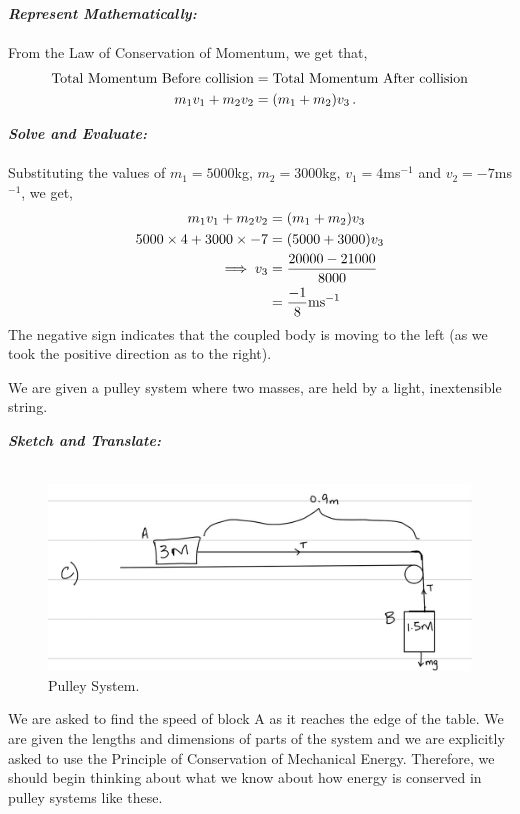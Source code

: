 \begin{subquestions}
\textbf{\textit{Represent Mathematically:}} \\ \\
From the Law of Conservation of Momentum, we get that,
\begin{align}
	\text{Total Momentum Before collision} & = \text{Total Momentum After collision} \nonumber \\
	m_1v_1 + m_2v_2 & = (m_1+m_2)v_3 \,.
\end{align}
	
	
	
	
\textbf{\textit{Solve and Evaluate:}} \\ \\
Substituting the values of $m_1=5000$kg, $m_2=3000$kg, $v_1=4$ms$^{-1}$ and $v_2=-7$ms$^{-1}$, we get,
\begin{align}
	m_1v_1 + m_2v_2 & = (m_1+m_2)v_3 \nonumber \\
	5000\times4 + 3000\times-7 & = (5000+3000)v_3 \nonumber \\
	\implies v_3 & = \frac{20000-21000}{8000} \nonumber \\
	             & = \frac{-1}{8}\text{ms}^{-1}
\end{align}
The negative sign indicates that the coupled body is moving to the left (as we took the positive direction as to the right).
	

\subquestion
We are given a pulley system where two masses, are held by a light, inextensible string.

\textbf{\textit{Sketch and Translate:}} \\ \\
\begin{figure}[H]
	\begin{center}
		\includegraphics[scale=0.25]{../2015/figures/2015q6-3}
		\caption{\label{2015:q6:fig:Sketch3} Pulley System.}
	\end{center}
\end{figure}	
We are asked to find the speed of block A as it reaches the edge of the table. We are given the lengths and dimensions of parts of the system and we are explicitly asked to use the Principle of Conservation of Mechanical Energy. Therefore, we should begin thinking about what we know about how energy is conserved in pulley systems like these.





\end{subquestions}

